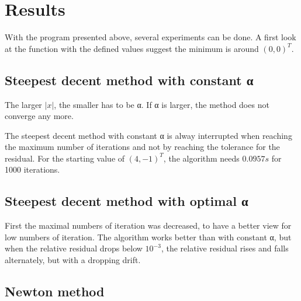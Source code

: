 \documentclass[a4paper,12pt]{article}
\begin{document}
\section{Results}
With the program presented above, several experiments can be done. 
A first look at the function with the defined values suggest the minimum is around $(0,0)^T$.

\subsection{Steepest decent method with constant α}
The larger $|x|$, the smaller has to be α. %
If α is larger, the method does not converge any more.

The steepest decent method with constant α is alway interrupted when reaching the maximum number of iterations and not by reaching the tolerance for the residual. For the starting value of $(4,-1)^T$, the algorithm needs $0.0957s$ for 1000 iterations.


\subsection{Steepest decent method with optimal α}
First the maximal numbers of iteration was decreased, to have a better view for low numbers of iteration.
The algorithm works better than with constant α, but when the relative residual drops below $10^{-3}$, the relative residual rises and falls alternately, but with a dropping drift.
\subsection{Newton method}
\end{document}

